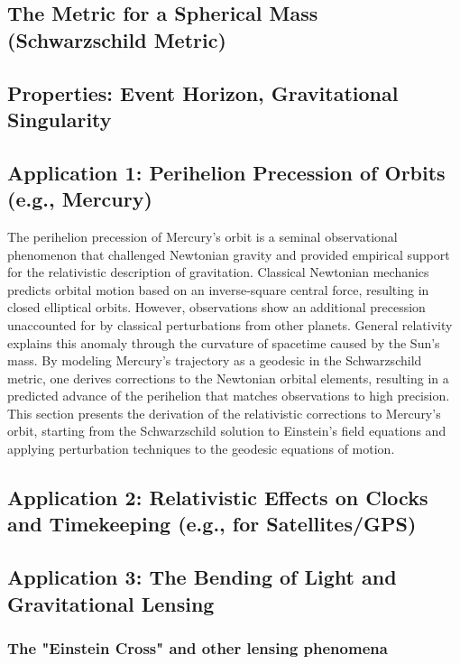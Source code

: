 \documentclass{amsart}
\theoremstyle{definition}
\theoremstyle{remark}
\begin{document}
\subsection{The Metric for a Spherical Mass (Schwarzschild Metric)}

\subsection{Properties: Event Horizon, Gravitational Singularity}

\subsection{Application 1: Perihelion Precession of Orbits (e.g., Mercury)}
\label{subsec:mercury_precession}
The perihelion precession of Mercury’s orbit is a seminal observational phenomenon that challenged Newtonian gravity and provided empirical support for the relativistic description of gravitation.
Classical Newtonian mechanics predicts orbital motion based on an inverse-square central force, resulting in closed elliptical orbits.
However, observations show an additional precession unaccounted for by classical perturbations from other planets.
General relativity explains this anomaly through the curvature of spacetime caused by the Sun’s mass.
By modeling Mercury’s trajectory as a geodesic in the Schwarzschild metric, one derives corrections to the Newtonian orbital elements, resulting in a predicted advance of the perihelion that matches observations to high precision.
This section presents the derivation of the relativistic corrections to Mercury’s orbit, starting from the Schwarzschild solution to Einstein’s field equations and applying perturbation techniques to the geodesic equations of motion.

\subsection{Application 2: Relativistic Effects on Clocks and Timekeeping (e.g., for Satellites/GPS)}

\subsection{Application 3: The Bending of Light and Gravitational Lensing}
\subsubsection{The "Einstein Cross" and other lensing phenomena}
\end{document}
